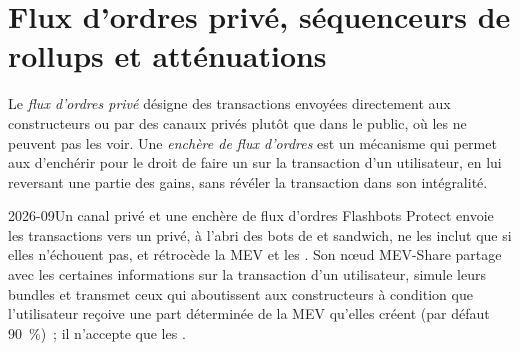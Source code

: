\section{Flux d'ordres privé, séquenceurs de rollups et atténuations}

\begin{definition}\label{def:m3:maximal-extractable-value:private}
Le \emph{flux d'ordres privé} désigne des transactions envoyées directement aux constructeurs ou par des canaux privés plutôt que dans le
 public, où les  ne peuvent pas les voir. Une \emph{enchère de flux d'ordres} est un mécanisme qui permet aux  d'enchérir pour le droit de
faire un  sur la transaction d'un utilisateur, en lui reversant une partie des gains, sans révéler la transaction dans son intégralité.
\end{definition}

\begin{dated}{2026-09}{Un canal privé et une enchère de flux d'ordres}\label{dat:m3:maximal-extractable-value:protect}
Flashbots Protect envoie les transactions vers un  privé, à l'abri des bots de  et sandwich, ne les inclut que si elles n'échouent pas, et
rétrocède la MEV et les . Son nœud MEV-Share partage avec les  certaines informations sur la transaction d'un utilisateur, simule leurs bundles et
transmet ceux qui aboutissent aux constructeurs à condition que l'utilisateur reçoive une part déterminée de la MEV qu'elles créent (par défaut 90~\%)~; il n'accepte que
les .
\end{dated}

